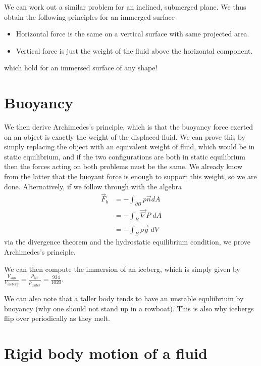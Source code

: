 \documentclass[10pt]{report}
\begin{document}
We can work out a similar problem for an inclined, submerged plane. We thus obtain the following principles for an immerged surface
\begin{itemize}
    \item Horizontal force is the same on a vertical surface with same projected area.
    \item Vertical force is just the weight of the fluid above the horizontal component.
\end{itemize}
which hold for an immersed surface of any shape!

\section{Buoyancy}

We then derive Archimedes's principle, which is that the buoyancy force exerted on an object is exactly the weight of the displaced fluid. We can prove this by simply replacing the object with an equivalent weight of fluid, which would be in static equilibrium, and if the two configurations are both in static equilibrium then the forces acting on both problems must be the same. We already know from the latter that the buoyant force is enough to support this weight, so we are done. Alternatively, if we follow through with the algebra
\begin{align}
    \vec{F}_b &= -\int_{\partial B} p\vec{n} dA\\
    &= -\int_B \vec{\nabla} P \;dA\\
    &= -\int_B \rho \vec{g}\; dV
\end{align}
via the divergence theorem and the hydrostatic equilibrium condition, we prove Archimedes's principle.

We can then compute the immersion of an iceberg, which is simply given by $\frac{V_{sub}}{V_{iceberg}} = \frac{\rho_{ice}}{\rho_{water}} = \frac{934}{1020}$.

We can also note that a taller body tends to have an unstable equliibrium by buoyancy (why one should not stand up in a rowboat). This is also why icebergs flip over periodically as they melt.

\section{Rigid body motion of a fluid}
\end{document}
